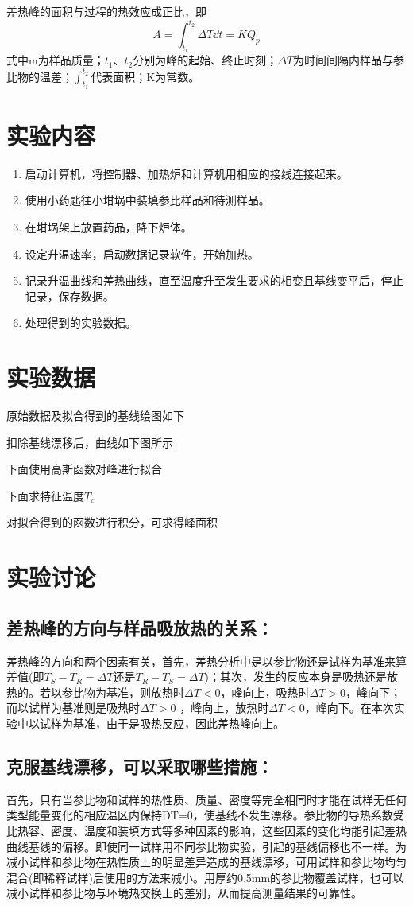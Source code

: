 \documentclass[a4paper]{article}
\begin{document}
差热峰的面积与过程的热效应成正比，即
\begin{equation}
A = \int_{t_1}^{t_2}\Delta T\dd t = KQ_p
\end{equation}
式中m为样品质量；$t_1$、$t_2$分别为峰的起始、终止时刻；$\Delta T$为时间间隔内样品与参比物的温差；$\int_{t_1}^{t_2}$代表面积；K为常数。

\section{实验内容}
\begin{enumerate}
\item 启动计算机，将控制器、加热炉和计算机用相应的接线连接起来。
\item 使用小药匙往小坩埚中装填参比样品和待测样品。
\item 在坩埚架上放置药品，降下炉体。
\item 设定升温速率，启动数据记录软件，开始加热。
\item 记录升温曲线和差热曲线，直至温度升至发生要求的相变且基线变平后，停止记录，保存数据。
\item 处理得到的实验数据。
\end{enumerate}

\section{实验数据}
原始数据及拟合得到的基线绘图如下

扣除基线漂移后，曲线如下图所示

下面使用高斯函数对峰进行拟合

下面求特征温度$ T_c $

对拟合得到的函数进行积分，可求得峰面积

\section{实验讨论}
\iffalse
\subsection*{差热峰的方向与样品吸放热的关系：}
差热峰的方向和两个因素有关，首先，差热分析中是以参比物还是试样为基准来算差值(即$T_S-T_R=\Delta T$还是$T_R-T_S=\Delta T$)；其次，发生的反应本身是吸热还是放热的。若以参比物为基准，则放热时$\Delta T<$0，峰向上，吸热时$\Delta T>$0，峰向下；而以试样为基准则是吸热时$\Delta T>$0 ，峰向上，放热时$\Delta T<$0，峰向下。在本次实验中以试样为基准，由于是吸热反应，因此差热峰向上。
\subsection*{克服基线漂移，可以采取哪些措施：}
首先，只有当参比物和试样的热性质、质量、密度等完全相同时才能在试样无任何类型能量变化的相应温区内保持DT=0，使基线不发生漂移。参比物的导热系数受比热容、密度、温度和装填方式等多种因素的影响，这些因素的变化均能引起差热曲线基线的偏移。即使同一试样用不同参比物实验，引起的基线偏移也不一样。为减小试样和参比物在热性质上的明显差异造成的基线漂移，可用试样和参比物均匀混合(即稀释试样)后使用的方法来减小。用厚约0.5mm的参比物覆盖试样，也可以减小试样和参比物与环境热交换上的差别，从而提高测量结果的可靠性。
\end{document}
